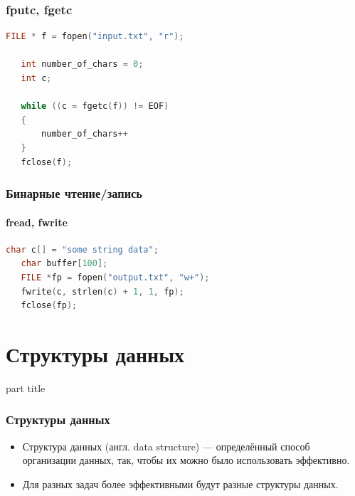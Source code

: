 \documentclass[14pt,pdf,hyperref={unicode}]{beamer}
\begin{document}
\begin{frame}[fragile]
\frametitle{fputc, fgetc}  
\begin{lstlisting}[language=C++,basicstyle=\ttfamily,keywordstyle=\color{blue},stringstyle=\color{orange}\ttfamily]
   FILE * f = fopen("input.txt", "r");
   
   int number_of_chars = 0;
   int c;
   
   while ((c = fgetc(f)) != EOF)
   {
       number_of_chars++
   }
   fclose(f);
\end{lstlisting}
\end{frame}

\begin{frame}[fragile]
\frametitle{Бинарные чтение/запись}  
\framesubtitle{fread, fwrite}  
\begin{lstlisting}[language=C++,basicstyle=\ttfamily,keywordstyle=\color{blue},stringstyle=\color{orange}\ttfamily]
   char c[] = "some string data";
   char buffer[100];
   FILE *fp = fopen("output.txt", "w+");
   fwrite(c, strlen(c) + 1, 1, fp);
   fclose(fp);
\end{lstlisting}
\end{frame}








\section{Структуры данных}
\begin{frame}
\begin{center}
\begin{beamercolorbox}[sep=8pt,center]{part
title}
\insertsection
\end{beamercolorbox}
\end{center}
\end{frame}




\begin{frame}[fragile]
\frametitle{Структуры данных}
\begin{itemize}
\item Структура данных (англ. data structure) — определённый способ организации данных, так, чтобы их можно было использовать эффективно.
\item Для разных задач более эффективными будут разные структуры данных.
\end{itemize}
\end{frame}
\end{document}
